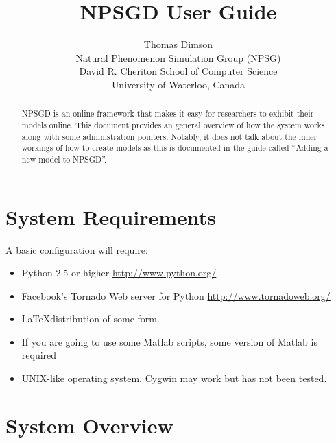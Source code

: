 \documentclass{article}
\title{NPSGD User Guide}
\author{Thomas Dimson\\Natural Phenomenon Simulation Group (NPSG)\\David R. Cheriton School of Computer Science\\University of Waterloo, Canada}
\begin{document}
\maketitle
\begin{abstract}
    NPSGD is an online framework that makes it easy for researchers to exhibit
    their models online. This document provides an general overview of how the
    system works along with some administration pointers. Notably, it does
    not talk about the inner workings of how to create models as this is
    documented in the guide called ``Adding a new model to NPSGD''.
\end{abstract}
\tableofcontents

\section{System Requirements}
\label{sec:requirements}
A basic configuration will require:
\begin{itemize}
    \item Python 2.5 or higher \url{http://www.python.org/}
    \item Facebook's Tornado Web server for Python
    \url{http://www.tornadoweb.org/}
    \item \LaTeX distribution of some form.
    \item If you are going to use some Matlab scripts, some version of Matlab is
    required
    \item UNIX-like operating system. Cygwin may work but has not been tested.
\end{itemize}


\section{System Overview}
\end{document}

